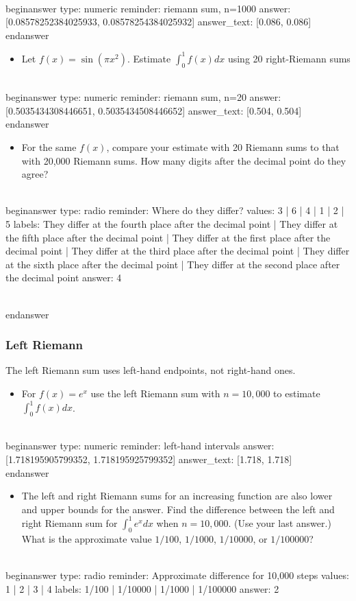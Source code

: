 \documentclass[12pt]{article}
\begin{document}
\\begin{answer}
    type: numeric
    reminder: riemann sum, n=1000
    answer: [0.08578252384025933, 0.08578254384025932]
    answer_text: [0.086, 0.086] 
\\end{answer}
\begin{itemize}\item Let $f(x) = \sin(\pi x^2)$. Estimate $\int_0^1 f(x) dx$ using 20 right-Riemann sums\end{itemize}
\\begin{answer}
    type: numeric
    reminder: riemann sum, n=20
    answer: [0.5035434308446651, 0.5035434508446652]
    answer_text: [0.504, 0.504] 
\\end{answer}
\begin{itemize}\item For the same $f(x)$, compare your estimate with 20 Riemann sums to   that with 20,000 Riemann sums. How many digits after the decimal   point do they agree?\end{itemize}
\\begin{answer}
type: radio
reminder: Where do they differ?
values: 3 | 6 | 4 | 1 | 2 | 5
labels: They differ at the fourth place after the decimal point | They differ at the fifth place after the decimal point | They differ at the first place after the decimal point | They differ at the third place after the decimal point | They differ at the sixth place after the decimal point | They differ at the second place after the decimal point
answer: 4

\\end{answer}
\subsubsection{Left Riemann}\newline
The left Riemann sum uses left-hand endpoints, not right-hand ones. \begin{itemize}\item For $f(x) = e^{x}$ use the left Riemann sum with $n=10,000$ to estimate $\int_0^1 f(x) dx$.\end{itemize}
\\begin{answer}
    type: numeric
    reminder: left-hand intervals
    answer: [1.718195905799352, 1.718195925799352]
    answer_text: [1.718, 1.718] 
\\end{answer}
\begin{itemize}\item The left and right Riemann sums for an increasing function are also   lower and upper bounds for the answer. Find the difference between   the left and right Riemann sum for $\int_0^1 e^x dx$ when   $n=10,000$. (Use your last answer.) What is the approximate value   $1/100$, $1/1000$, $1/10000$, or $1/100000$?\end{itemize}
\\begin{answer}
type: radio
reminder: Approximate difference for 10,000 steps
values: 1 | 2 | 3 | 4
labels: 1/100 | 1/10000 | 1/1000 | 1/100000
answer: 2
\end{document}
